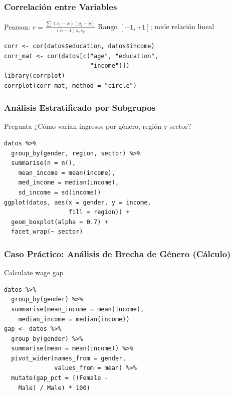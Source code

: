 \documentclass[aspectratio=169,11pt]{beamer}
\begin{document}
\begin{frame}[fragile]
\frametitle{Correlación entre Variables}
\small

\begin{block}{Pearson: $r = \frac{\sum (x_i - \bar{x})(y_i - \bar{y})}{(n-1) s_x s_y}$}
  Rango $[-1, +1]$; mide relación lineal
\end{block}

\begin{lstlisting}[basicstyle=\ttfamily\tiny]
corr <- cor(datos$education, datos$income)
corr_mat <- cor(datos[c("age", "education",
                        "income")])
library(corrplot)
corrplot(corr_mat, method = "circle")
\end{lstlisting}
\end{frame}

\begin{frame}[fragile]
\frametitle{Análisis Estratificado por Subgrupos}
\small

\begin{exampleblock}{Pregunta}
  ¿Cómo varían ingresos por género, región y sector?
\end{exampleblock}

\begin{lstlisting}[basicstyle=\ttfamily\tiny]
datos %>%
  group_by(gender, region, sector) %>%
  summarise(n = n(),
    mean_income = mean(income),
    med_income = median(income),
    sd_income = sd(income))
ggplot(datos, aes(x = gender, y = income,
                  fill = region)) +
  geom_boxplot(alpha = 0.7) +
  facet_wrap(~ sector)
\end{lstlisting}
\end{frame}

\begin{frame}[fragile]
\frametitle{Caso Práctico: Análisis de Brecha de Género (Cálculo)}

\begin{exampleblock}{Calculate wage gap}
  \begin{lstlisting}[basicstyle=\ttfamily\tiny]
datos %>%
  group_by(gender) %>%
  summarise(mean_income = mean(income),
    median_income = median(income))
gap <- datos %>%
  group_by(gender) %>%
  summarise(mean = mean(income)) %>%
  pivot_wider(names_from = gender,
              values_from = mean) %>%
  mutate(gap_pct = ((Female -
    Male) / Male) * 100)
  \end{lstlisting}
\end{exampleblock}
\end{frame}
\end{document}
